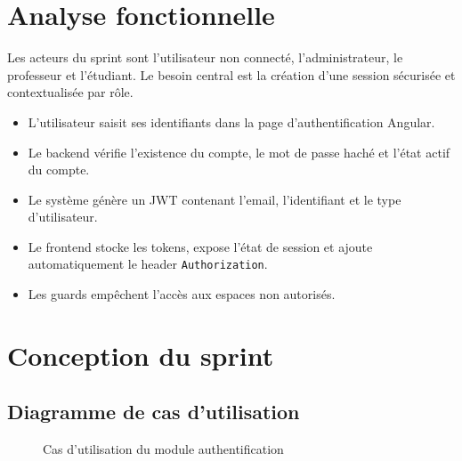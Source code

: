 \documentclass[12pt,a4paper]{report}
\begin{document}
\section{Analyse fonctionnelle}

Les acteurs du sprint sont l'utilisateur non connecté, l'administrateur, le professeur et l'étudiant. Le besoin central est la création d'une session sécurisée et contextualisée par rôle.

\begin{itemize}[itemsep=0.4em]
    \item L'utilisateur saisit ses identifiants dans la page d'authentification Angular.
    \item Le backend vérifie l'existence du compte, le mot de passe haché et l'état actif du compte.
    \item Le système génère un JWT contenant l'email, l'identifiant et le type d'utilisateur.
    \item Le frontend stocke les tokens, expose l'état de session et ajoute automatiquement le header \texttt{Authorization}.
    \item Les guards empêchent l'accès aux espaces non autorisés.
\end{itemize}

\section{Conception du sprint}

\subsection*{Diagramme de cas d'utilisation}

\begin{figure}[H]
\centering
{}
\caption{Cas d'utilisation du module authentification}
\label{fig:sprint1-usecase}
\end{figure}
\end{document}
